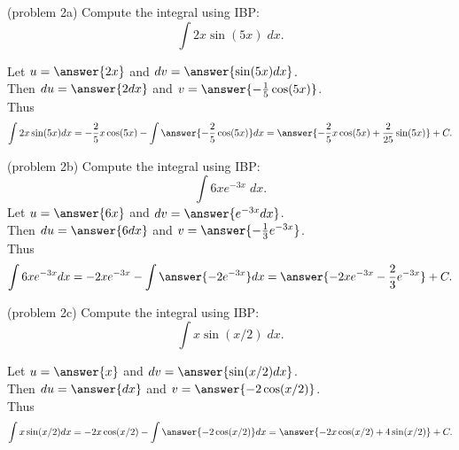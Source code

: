\documentclass{ximera}
\begin{document}
\begin{problem}(problem 2a)
Compute the integral using IBP:
  \[
  \int 2x\sin(5x)\;dx.
  \]

Let $u = \answer{2x}$   and   $dv = \answer{\sin(5x) dx}$.\\
  Then $du = \answer{2 dx}$   and   $v = \answer{-\frac15 \cos(5x)}$.\\
  Thus 
  \[
  \int 2x\sin(5x) dx = -\frac25 x\cos(5x) - \int \answer{-\frac25 \cos(5x)} dx = \answer{-\frac25 x\cos(5x) +\frac{2}{25} \sin(5x)} + C.
  \]
  
\end{problem}


\begin{problem}(problem 2b)
Compute the integral using IBP:
  \[
  \int 6xe^{-3x} \;dx.
  \]
Let $u = \answer{6x}$   and   $dv = \answer{e^{-3x} dx}$.\\
  Then $du = \answer{6 dx}$   and   $v = \answer{-\frac13 e^{-3x}}$.\\
  Thus 
  \[
  \int 6xe^{-3x} dx = -2 xe^{-3x} -\int \answer{-2 e^{-3x}} dx = \answer{-2 xe^{-3x} - \frac23 e^{-3x}} + C.
  \]
  
\end{problem}


\begin{problem}(problem 2c)
Compute the integral using IBP:
  \[
  \int x\sin(x/2) \;dx.
  \]

Let $u = \answer{x}$   and   $dv = \answer{\sin(x/2) dx}$.\\
  Then $du = \answer{ dx}$   and   $v = \answer{-2 \cos(x/2)}$.\\
  Thus 
  \[
  \int x\sin(x/2) dx = -2x\cos(x/2) - \int \answer{-2 \cos(x/2)} dx = \answer{-2x\cos(x/2) + 4 \sin(x/2)} + C.
  \]
  
\end{problem}
\end{document}

